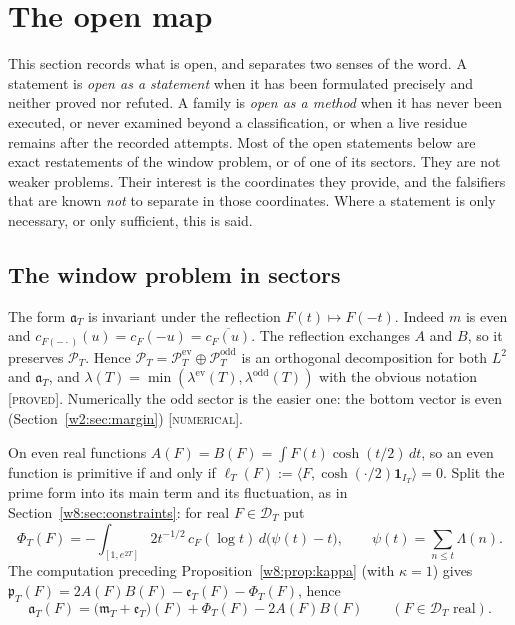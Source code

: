 \documentclass[11pt]{amsart}
\theoremstyle{definition}
\theoremstyle{remark}
\numberwithin{equation}{section}
\newcommand{\IT}{I_T}                                  %
\newcommand{\cF}{c_F}                                  %
\newcommand{\PT}{\mathcal{P}_T}                        %
\newcommand{\DT}{\mathcal{D}_T}                        %
\newcommand{\mT}{\mathfrak{m}_T}                       %
\newcommand{\pT}{\mathfrak{p}_T}                       %
\newcommand{\aT}{\mathfrak{a}_T}                       %
\newcommand{\lam}{\lambda(T)}                          %
\newcommand{\stag}[1]{\textsc{[#1]}}
\newcommand{\PROVED}{\stag{proved}}
\newcommand{\NUM}{\stag{numerical}}
\begin{document}
\section{The open map}\label{w8:sec:open}

This section records what is open, and separates two senses of the word. A statement is \emph{open as a statement}
when it has been formulated precisely and neither proved nor refuted. A family is \emph{open as a method} when it has
never been executed, or never examined beyond a classification, or when a live residue remains after the recorded
attempts. Most of the open statements below are exact restatements of the window problem, or of one of its sectors.
They are not weaker problems. Their interest is the coordinates they provide, and the falsifiers that are known
\emph{not} to separate in those coordinates. Where a statement is only necessary, or only sufficient, this is said.

\subsection{The window problem in sectors}

The form $\aT$ is invariant under the reflection $F(t)\mapsto F(-t)$. Indeed $m$ is even and
$c_{F(-\cdot)}(u)=\cF(-u)=\overline{\cF(u)}$. The reflection exchanges $A$ and $B$, so it preserves $\PT$. Hence
$\PT=\PT^{\mathrm{ev}}\oplus\PT^{\mathrm{odd}}$ is an orthogonal decomposition for both $L^2$ and $\aT$, and
$\lam=\min(\lambda^{\mathrm{ev}}(T),\lambda^{\mathrm{odd}}(T))$ with the obvious notation \PROVED. Numerically the
odd sector is the easier one: the bottom vector is even (Section~\ref{w2:sec:margin}) \NUM.

On even real functions $A(F)=B(F)=\int F(t)\cosh(t/2)\,dt$, so an even function is primitive if and only if
$\ell_T(F):=\langle F,\cosh(\cdot/2)\mathbf 1_{\IT}\rangle=0$. Split the prime form into its main term and its
fluctuation, as in Section~\ref{w8:sec:constraints}: for real $F\in\DT$ put
\begin{equation}\label{w8:eq:Phi}
\Phi_T(F)=-\int_{[1,e^{2T}]}2t^{-1/2}\,\cF(\log t)\,d\bigl(\psi(t)-t\bigr),\qquad \psi(t)=\sum_{n\le t}\Lambda(n).
\end{equation}
The computation preceding Proposition~\ref{w8:prop:kappa} (with $\kappa=1$) gives
$\pT(F)=2A(F)B(F)-\mathfrak e_T(F)-\Phi_T(F)$, hence
\begin{equation}\label{w8:eq:aTsplit}
\aT(F)=\bigl(\mT+\mathfrak e_T\bigr)(F)+\Phi_T(F)-2A(F)B(F)\qquad(F\in\DT\text{ real}).
\end{equation}
\end{document}

